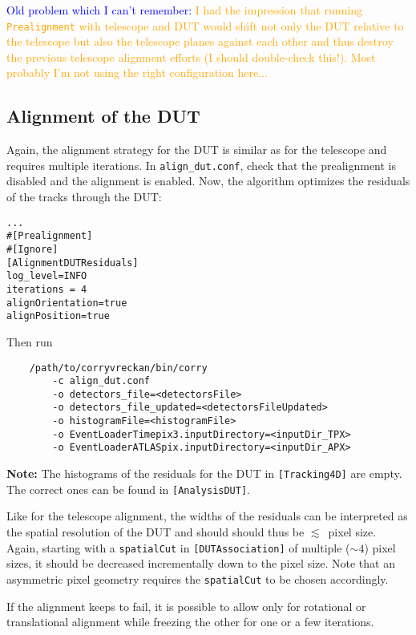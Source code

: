\textcolor{blue}{Old problem which I can't remember: }\textcolor{orange}{I had the impression that running \texttt{Prealignment} with telescope and DUT would shift not only the DUT relative to the telescope but also the telescope planes against each other and thus destroy the previous telescope alignment efforts (I should double-check this!). Most probably I'm not using the right configuration here...}

\subsection*{Alignment of the DUT}
Again, the alignment strategy for the DUT is similar as for the telescope and requires multiple iterations.
In \texttt{align\_dut.conf}, check that the prealignment is disabled and the alignment is enabled.
Now, the algorithm optimizes the residuals of the tracks through the DUT:

\begin{verbatim}
...
#[Prealignment]
#[Ignore]
[AlignmentDUTResiduals]
log_level=INFO
iterations = 4
alignOrientation=true
alignPosition=true
\end{verbatim}

Then run
\begin{verbatim}
    /path/to/corryvreckan/bin/corry 
    	-c align_dut.conf 
    	-o detectors_file=<detectorsFile> 
    	-o detectors_file_updated=<detectorsFileUpdated> 
    	-o histogramFile=<histogramFile> 
    	-o EventLoaderTimepix3.inputDirectory=<inputDir_TPX>
    	-o EventLoaderATLASpix.inputDirectory=<inputDir_APX>
\end{verbatim}

\textbf{Note:} The histograms of the residuals for the DUT in \texttt{[Tracking4D]} are empty. The correct ones can be found in \texttt{[AnalysisDUT]}.

Like for the telescope alignment, the widths of the residuals can be interpreted as the spatial resolution of the DUT and should should thus be $\lesssim$~pixel size.
Again, starting with a \texttt{spatialCut} in \texttt{[DUTAssociation]} of multiple ($\sim4$) pixel sizes, it should be decreased incrementally down to the pixel size. Note that an asymmetric pixel geometry requires the \texttt{spatialCut} to be chosen accordingly.

If the alignment keeps to fail, it is possible to allow only for rotational or translational alignment while freezing the other for one or a few iterations.

